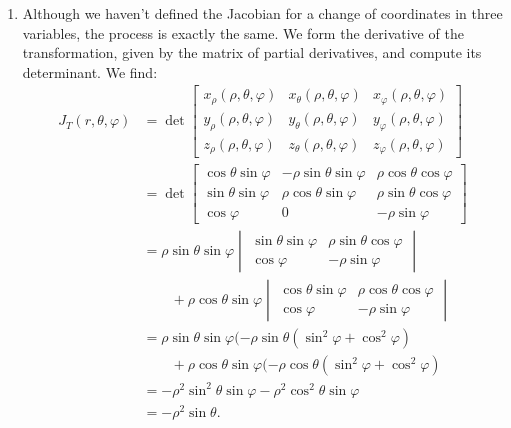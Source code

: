 {\begin{enumerate}
\item Although we haven't defined the Jacobian for a change of coordinates in three variables, the process is exactly the same. We form the derivative of the transformation, given by the matrix of partial derivatives, and compute its determinant. We find:
\begin{align*}
J_T(r,\theta,\varphi) &= \det\begin{bmatrix} 
x_\rho(\rho,\theta,\varphi) & x_\theta(\rho,\theta,\varphi) & x_\varphi(\rho,\theta,\varphi)\\
y_\rho(\rho,\theta,\varphi) & y_\theta(\rho,\theta,\varphi) & y_\varphi(\rho,\theta,\varphi)\\
z_\rho(\rho,\theta,\varphi) & z_\theta(\rho,\theta,\varphi) & z_\varphi(\rho,\theta,\varphi)\end{bmatrix}\\
& = \det\begin{bmatrix}
\cos\theta\sin\varphi & -\rho\sin\theta\sin\varphi & \rho\cos\theta\cos\varphi\\
\sin\theta\sin\varphi & \rho\cos\theta\sin\varphi & \rho\sin\theta\cos\varphi\\
\cos\varphi & 0 & -\rho\sin\varphi\end{bmatrix}\\
& = \rho\sin\theta\sin\varphi\begin{vmatrix}
\sin\theta\sin\varphi & \rho\sin\theta\cos\varphi\\
\cos\varphi & -\rho\sin\varphi
\end{vmatrix}\\
&\quad\quad + \rho\cos\theta\sin\varphi\begin{vmatrix}
\cos\theta\sin\varphi & \rho\cos\theta\cos\varphi\\
\cos\varphi &-\rho\sin\varphi
\end{vmatrix}\\
&=\rho\sin\theta\sin\varphi(-\rho\sin\theta(\sin^2\varphi+\cos^2\varphi)\\
&\quad\quad+\rho\cos\theta\sin\varphi(-\rho\cos\theta(\sin^2\varphi+\cos^2\varphi)\\
&=-\rho^2\sin^2\theta\sin\varphi-\rho^2\cos^2\theta\sin\varphi\\
&=-\rho^2\sin\theta.
\end{align*}

\end{enumerate}
\baselineskip}\\

